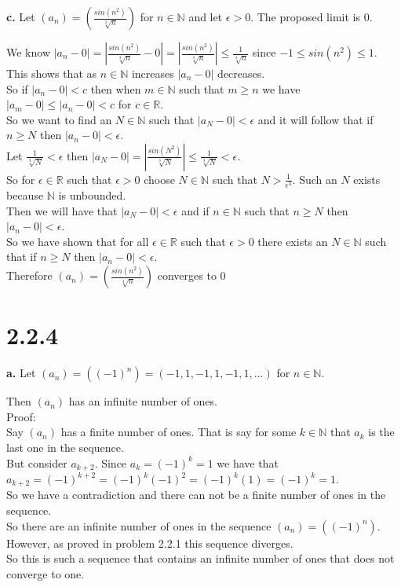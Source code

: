 \documentclass{article}
\begin{document}
{\Large \textbf{c.}} Let $(a_n) = (\frac{sin(n^2)}{\sqrt[3]{n}})$ for $n\in\mathbb{N}$ and let $\epsilon > 0$. The proposed limit is $0$.
\begin{center}
    \doublespacing
    We know {\large $|a_n - 0| = |\frac{sin(n^2)}{\sqrt[3]{n}} -0| = |\frac{sin(n^2)}{\sqrt[3]{n}}|\leq \frac{1}{\sqrt[3]{n}}$} since $-1\leq sin(n^2)\leq 1$.
    \\This shows that as $n\in\mathbb{N}$ increases $|a_n - 0|$ decreases.
    \\So if $|a_n - 0| < c$ then when $m\in\mathbb{N}$ such that $m\geq n$ we have $|a_m - 0|\leq |a_n - 0| < c$ for $c\in\mathbb{R}$.
    \\So we want to find an $N\in\mathbb{N}$ such that $|a_N - 0| <\epsilon$ and it will follow that if $n\geq N$ then $|a_n - 0| <\epsilon$.
    \\Let {\large $\frac{1}{\sqrt[3]{N}} <\epsilon$} then {\large $|a_N - 0| = |\frac{sin(N^2)}{\sqrt[3]{N}}|\leq \frac{1}{\sqrt[3]{N}} <\epsilon$}.
     \\So for $\epsilon\in\mathbb{R}$ such that $\epsilon > 0$ choose $N\in\mathbb{N}$ such that {\large $N >\frac{1}{\epsilon ^3}$}. Such an $N$ exists because $\mathbb{N}$ is unbounded.
     \\Then we will have that $|a_N - 0| <\epsilon$ and if $n\in\mathbb{N}$ such that $n\geq N$ then $|a_n - 0| <\epsilon$.
    \\So we have shown that for all $\epsilon\in\mathbb{R}$ such that $\epsilon > 0$ there exists an $N\in\mathbb{N}$ such that if $n\geq N$ then $|a_n - 0| <\epsilon$.
    \\Therefore $(a_n) = (\frac{sin(n^2)}{\sqrt[3]{n}})$ converges to $0$ \qedsymbol
\end{center}

\newpage
\section*{2.2.4}

{\Large \textbf{a.}} Let $(a_n) = ((-1)^n) = (-1, 1, -1, 1, -1, 1, ...)$ for $n\in\mathbb{N}$.
\begin{center}
    \doublespacing
    Then $(a_n)$ has an infinite number of ones.
    \\Proof:
    \\Say $(a_n)$ has a finite number of ones. That is say for some $k\in\mathbb{N}$ that $a_k$ is the last one in the sequence.
    \\But consider $a_{k+2}$. Since $a_k = (-1)^k = 1$ we have that $a_{k+2} = (-1)^{k+2} = (-1)^k(-1)^2 = (-1)^k(1) = (-1)^k = 1$.
    \\So we have a contradiction and there can not be a finite number of ones in the sequence.
    \\So there are an infinite number of ones in the sequence $(a_n) = ((-1)^n)$.
    \\However, as proved in problem 2.2.1 this sequence diverges.
    \\So this is such a sequence that contains an infinite number of ones that does not converge to one.
\end{center}
\end{document}
